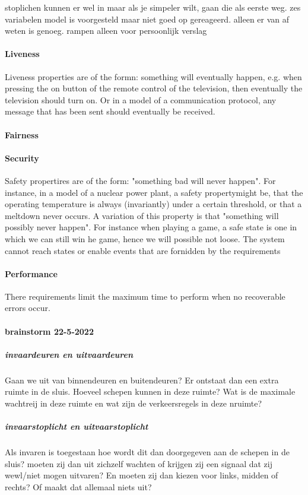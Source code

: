 {{{{{{{{{{{{{{stoplichen kunnen er wel in maar als je simpeler wilt, gaan die als eerste weg.
zes variabelen model is voorgesteld maar niet goed op gereageerd. alleen er van af weten is genoeg.
rampen alleen voor persoonlijk verslag

 


 

\paragraph{Liveness}
Liveness properties are of the formn: something will eventually happen, e.g. when pressing the on button of the remote control of the television, then eventually the television should turn on. Or in a model of a  communication protocol, any message that has been sent should eventually be received.
\paragraph{Fairness}
\paragraph{Security}
Safety propertires are of the form: "something bad will never happen". For instance, in a model of a nuclear power plant, a safety propertymight be, that the operating temperature is always (invariantly) under a certain threshold, or that a meltdown never occurs. A variation of this property is that "something will possibly never happen".
 For instance when playing a game, a safe state is one in which we can still win he game, hence we will possible not loose.
The system cannot reach states or enable events that are fornidden by the requirements
\paragraph{Performance}
There requirements limit the maximum time to perform when no recoverable errors occur.



\paragraph{brainstorm 22-5-2022}

\subparagraph{invaardeuren en uitvaardeuren}
Gaan we uit van binnendeuren en buitendeuren? Er ontstaat dan een extra ruimte in de sluis. Hoeveel schepen kunnen in deze ruimte? Wat is de maximale wachtreij in deze ruimte en wat zijn de verkeersregels in deze nruimte?
\subparagraph{invaarstoplicht en uitvaarstoplicht}
Als invaren is toegestaan hoe wordt dit dan doorgegeven aan de schepen in de sluis? moeten zij dan uit zichzelf wachten of krijgen zij een signaal dat zij wewl/niet mogen uitvaren? En moeten zij dan kiezen voor links, midden of rechts? Of maakt dat allemaal niets uit?

}}}}}}}}}}}}}}
